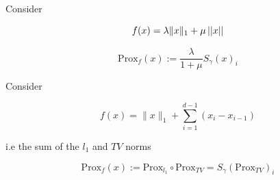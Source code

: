 \documentclass{article}
\begin{document}
\begin{example}
Consider

\begin{equation}
f(x) = \lambda\|x\|_1 + \mu \left|\left|x\right|\right| 
\end{equation}

\begin{equation}
\mathrm{Prox}_f\left(x\right) := \frac{\lambda}{1+\mu} S_\gamma\left(x\right)_i 
\end{equation}
\end{example}

\begin{example}
Consider

\begin{equation}
f(x) = \|x\|_1 + \sum_{i=1}^{d-1} \left( x_i - x_{i-1} \right) 
\end{equation}

i.e the sum of the \(l_1\) and \(TV\) norms

\begin{equation}
\mathrm{Prox}_f\left(x\right) := \mathrm{Prox}_{l_1} \circ \mathrm{Prox}_{TV} =  S_\gamma\left(\mathrm{Prox}_{TV}\right)_i 
\end{equation}
\end{example}
\end{document}
